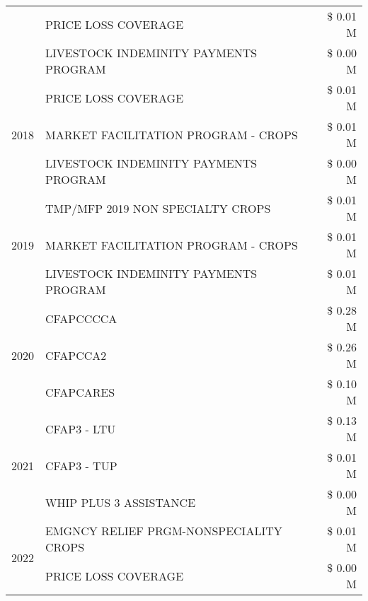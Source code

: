 \begin{tabular}{llr}
 & PRICE LOSS COVERAGE & \$ 0.01 M \\
 & LIVESTOCK INDEMINITY PAYMENTS PROGRAM & \$ 0.00 M \\
\cline{1-3}
\multirow[t]{3}{*}{2018} & PRICE LOSS COVERAGE & \$ 0.01 M \\
 & MARKET FACILITATION PROGRAM - CROPS & \$ 0.01 M \\
 & LIVESTOCK INDEMINITY PAYMENTS PROGRAM & \$ 0.00 M \\
\cline{1-3}
\multirow[t]{3}{*}{2019} & TMP/MFP 2019 NON SPECIALTY CROPS & \$ 0.01 M \\
 & MARKET FACILITATION PROGRAM - CROPS & \$ 0.01 M \\
 & LIVESTOCK INDEMINITY PAYMENTS PROGRAM & \$ 0.01 M \\
\cline{1-3}
\multirow[t]{3}{*}{2020} & CFAPCCCCA & \$ 0.28 M \\
 & CFAPCCA2 & \$ 0.26 M \\
 & CFAPCARES & \$ 0.10 M \\
\cline{1-3}
\multirow[t]{3}{*}{2021} & CFAP3 - LTU & \$ 0.13 M \\
 & CFAP3 - TUP & \$ 0.01 M \\
 & WHIP PLUS 3 ASSISTANCE & \$ 0.00 M \\
\cline{1-3}
\multirow[t]{2}{*}{2022} & EMGNCY RELIEF PRGM-NONSPECIALITY CROPS & \$ 0.01 M \\
 & PRICE LOSS COVERAGE & \$ 0.00 M \\
\cline{1-3}
\bottomrule
\end{tabular}
